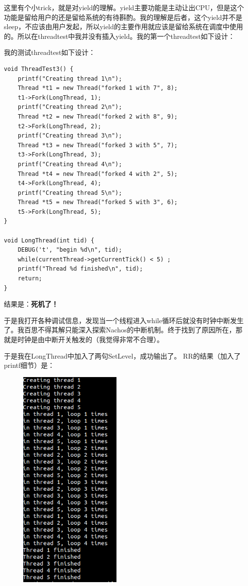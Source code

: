 \documentclass[nofonts]{ctexart}
\begin{document}
这里有个小trick，就是对yield的理解。yield主要功能是主动让出CPU，但是这个功能是留给用户的还是留给系统的有待斟酌。我的理解是后者，这个yield并不是sleep，不应该由用户发起，所以yield的主要作用就应该是留给系统在调度中使用的。所以在threadtest中我并没有插入yield。我的第一个threadtest如下设计：

我的测试threadtest如下设计：
\begin{lstlisting}
void ThreadTest3() {
    printf("Creating thread 1\n");
    Thread *t1 = new Thread("forked 1 with 7", 8);
    t1->Fork(LongThread, 1);
    printf("Creating thread 2\n");
    Thread *t2 = new Thread("forked 2 with 8", 9);
    t2->Fork(LongThread, 2);
    printf("Creating thread 3\n");
    Thread *t3 = new Thread("forked 3 with 5", 7);
    t3->Fork(LongThread, 3);
    printf("Creating thread 4\n");
    Thread *t4 = new Thread("forked 4 with 2", 5);
    t4->Fork(LongThread, 4);
    printf("Creating thread 5\n");
    Thread *t5 = new Thread("forked 5 with 3", 6);
    t5->Fork(LongThread, 5);
}

void LongThread(int tid) {
    DEBUG('t', "begin %d\n", tid);
    while(currentThread->getCurrentTick() < 5) ;
    printf("Thread %d finished\n", tid);
    return;
}
\end{lstlisting}

结果是：\textbf{死机了！}

于是我打开各种调试信息，发现当一个线程进入while循环后就没有时钟中断发生了。我百思不得其解只能深入探索Nachos的中断机制。终于找到了原因所在，那就是时钟是由中断开关触发的（我觉得非常不合理）。

于是我在LongThread中加入了两句SetLevel，成功输出了。
RR的结果（加入了printf细节）是：
\begin{figure}[h]
 \centering
\includegraphics[width=2in]{ex24.png}
\end{figure}
\end{document}

